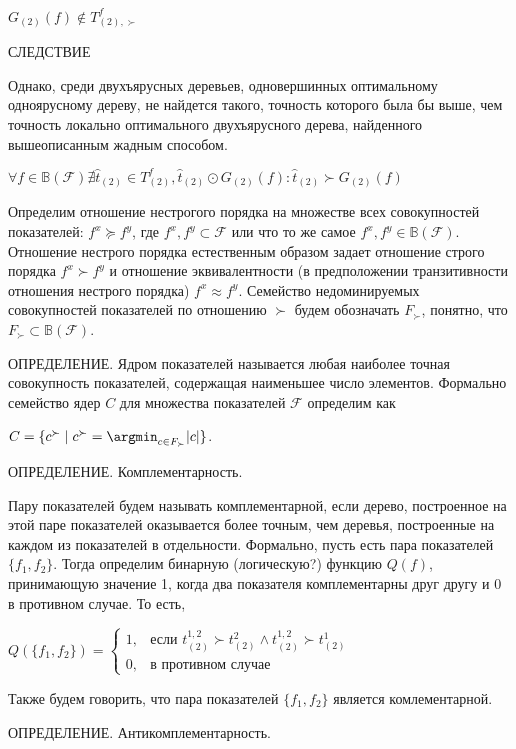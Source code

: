 \documentclass[12pt]{a&t}
\begin{document}
$G_{(2)}(f) \notin T_{(2), \succ}^f$

СЛЕДСТВИЕ

Однако, среди двухъярусных деревьев, одновершинных оптимальному одноярусному дереву, не найдется такого, точность которого была бы выше, чем точность локально оптимального двухъярусного дерева, найденного вышеописанным жадным способом.

$\forall f \in \mathbb{B}(\mathscr{F}) \nexists \hat{t}_{(2)} \in T_{(2)}^f, \hat{t}_{(2)} \odot G_{(2)}(f):  \hat{t}_{(2)} \succ G_{(2)}(f)$

Определим отношение нестрогого порядка на множестве всех совокупностей показателей: $f^x \succeq f^y$, где $f^x, f^y \subset \mathscr{F}$ или что то же самое $f^x, f^y \in \mathbb{B} ( \mathscr{F} )$. Отношение нестрого порядка естественным образом задает отношение строго порядка $f^x  \succ f^y$ и отношение эквивалентности (в предположении транзитивности отношения нестрого порядка) $f^x \approx f^y$.  Семейство недоминируемых совокупностей показателей по отношению $\succ$ будем обозначать $F_{\succ}$, понятно, что $F_{\succ} \subset \mathbb{B} (\mathscr{F})$. 

ОПРЕДЕЛЕНИЕ. Ядром показателей называется любая наиболее точная совокупность показателей, содержащая наименьшее число элементов. Формально семейство ядер $C$ для множества показателей $\mathscr{F}$ определим как

$C = \{c^{\succ} \mid c^{\succ} = \argmin_{c \in F_{\succ}} {|c|}  \}$.

ОПРЕДЕЛЕНИЕ. Комплементарность.

Пару показателей будем называть комплементарной, если дерево, построенное на этой паре показателей оказывается более точным, чем деревья, построенные на каждом из показателей в отдельности. Формально, пусть есть пара показателей $\{f_1, f_2\}$. Тогда определим бинарную (логическую?) функцию $Q(f)$, принимающую значение 1, когда два показателя комплементарны друг другу и 0 в противном случае. То есть,

$
Q(\{f_1, f_2\}) = \begin{cases}
  1,  & \mbox{если } t^{1,2}_{(2)} \succ t^2_{(2)} \land t^{1,2}_{(2)} \succ t^1_{(2)} \\
  0, & \mbox{в противном случае }
\end{cases}
$

Также будем говорить, что пара показателей $\{f_1, f_2\}$ является комлементарной. 

ОПРЕДЕЛЕНИЕ. Антикомплементарность.
\end{document}
